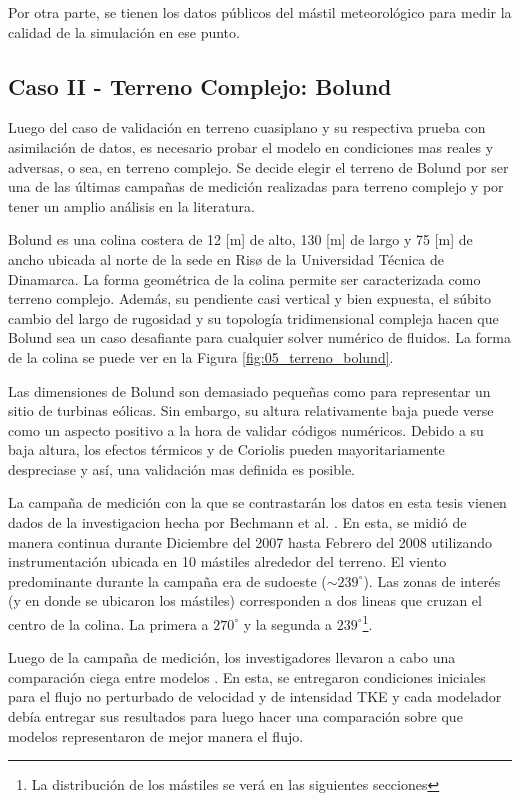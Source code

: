 Por otra parte, se tienen los datos públicos del mástil meteorológico para medir la calidad de la simulación en ese punto.
\subsection{Caso II - Terreno Complejo: Bolund}
Luego del caso de validación en terreno cuasiplano y su respectiva prueba con asimilación de datos, es necesario probar el modelo en condiciones mas reales y adversas, o sea, en terreno complejo. Se decide elegir el terreno de Bolund por ser una de las últimas campañas de medición realizadas para terreno complejo y por tener un amplio análisis en la literatura.

Bolund es una colina costera de 12 [m] de alto, 130 [m] de largo y 75 [m] de ancho ubicada al norte de la sede en Risø de la Universidad Técnica de Dinamarca. La forma geométrica de la colina permite ser caracterizada como terreno complejo. Además, su pendiente casi vertical y bien expuesta, el súbito cambio del largo de rugosidad y su topología tridimensional compleja hacen que Bolund sea un caso desafiante para cualquier solver numérico de fluidos. La forma de la colina se puede ver en la Figura \ref{fig:05_terreno_bolund}.

Las dimensiones de Bolund son demasiado pequeñas como para representar un sitio de turbinas eólicas. Sin embargo, su altura relativamente baja puede verse como un aspecto positivo a la hora de validar códigos numéricos. Debido a su baja altura, los efectos térmicos y de Coriolis pueden mayoritariamente despreciase y así, una validación mas definida es posible.

La campaña de medición con la que se contrastarán los datos en esta tesis vienen dados de la investigacion hecha por Bechmann et al. \cite{3d4285ac04444eb3b9775baf9af052c6}. En esta, se midió de manera continua durante Diciembre del 2007 hasta Febrero del 2008 utilizando instrumentación ubicada en 10 mástiles alrededor del terreno.  El viento predominante durante la campaña era de sudoeste ($\sim\!239^\circ$). Las zonas de interés (y en donde se ubicaron los mástiles) corresponden a dos lineas que cruzan el centro de la colina. La primera a $270^\circ$ y la segunda a $239^\circ$\footnote{La distribución de los mástiles se verá en las siguientes secciones}.

Luego de la campaña de medición, los investigadores llevaron a cabo una comparación ciega entre modelos \cite{Bechmann2011}. En esta, se entregaron condiciones iniciales para el flujo no perturbado de velocidad y de intensidad TKE y cada modelador debía entregar sus resultados para luego hacer una comparación sobre que modelos representaron de mejor manera el flujo.

